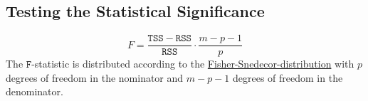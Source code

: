 \subsection{Testing the Statistical Significance}

\begin{equation}
  \label{eq:F-statistic}
  F = \frac{\mathtt{TSS} - \mathtt{RSS}}{\mathtt{RSS}} \cdot \frac{m - p - 1}{p}
\end{equation}
The $\mathtt{F}$-statistic is distributed according to the
\href{https://en.wikipedia.org/wiki/F-distribution}{Fisher-Snedecor-distribution} with $p$ degrees of freedom
in the nominator and $m - p - 1$ degrees of freedom in the denominator. 

